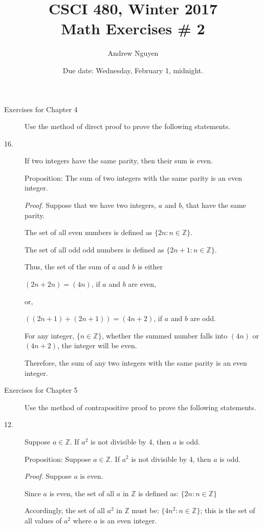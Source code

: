 \documentclass{article}
\title{CSCI 480, Winter 2017\\Math Exercises \# 2}
\author{Andrew Nguyen}
\date{Due date:  Wednesday, February 1, midnight.}
\begin{document}
\maketitle



\begin{description}
\item[Exercises for Chapter 4]
Use the method of direct proof to prove the following statements.
\item[16.] If two integers have the same parity, then their sum is even.

Proposition: The sum of two integers with the same parity is an even integer.

\textit{Proof.} Suppose that we have two integers, $a$ and $b$, that have the same parity.

The set of all even numbers is defined as $\{2n:n\in\mathbb{Z}\}$.

The set of all odd odd numbers is defined as $\{2n+1:n\in\mathbb{Z}\}$.

Thus, the set of the sum of $a$ and $b$ is either 

$(2n+2n) = (4n)$, if $a$ and $b$ are even,

or, 

$((2n+1)+(2n+1)) = (4n+2)$, if $a$ and $b$ are odd.

For any integer, $\{n\in\mathbb{Z}\}$, whether the summed number falls into
$(4n)$ or $(4n+2)$, the integer will be even.

Therefore, the sum of any two integers with the same parity is an even integer.

\item[Exercises for Chapter 5]
Use the method of contrapositive proof to prove the following statements.
\item[12.]  Suppose $a\in\mathbb{Z}$.  If $a^2$ is not divisible by 4,
  then $a$ is odd.
  
  Proposition: Suppose $a\in\mathbb{Z}$. If $a^2$ is not divisible by 4,
  then $a$ is odd.
  
  \textit{Proof.} Suppose $a$ is even.
  
  Since $a$ is even, the set of all $a$ in $\mathbb{Z}$ is defined as:
    $\{2n:n\in\mathbb{Z}\}$
  
  Accordingly, the set of all $a^2$ in $\mathbb{Z}$ must be: $\{4n^2:n\in\mathbb{Z}\}$;
  this is the set of all values of $a^2$ where $a$ is an even integer.
  

\end{description}
\end{document}
